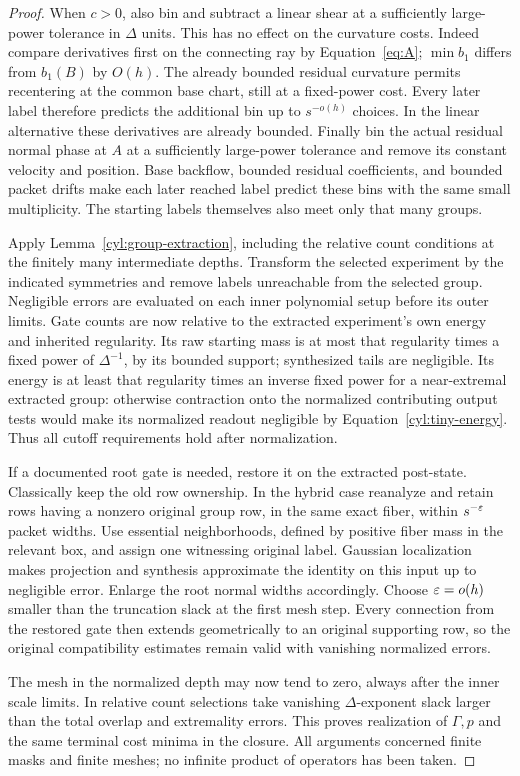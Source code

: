 \begin{proof}
When $c>0$, also bin and subtract a linear shear at a sufficiently
large-power tolerance in $\Delta$ units.  This has no effect on the
curvature costs.  Indeed compare derivatives first on the connecting
ray by Equation~\eqref{eq:A}; $\min b_1$ differs from $b_1(B)$ by
$O(h)$.  The already bounded residual curvature permits recentering
at the common base chart, still at a fixed-power cost.  Every later
label therefore predicts the additional bin up to $s^{-o(h)}$ choices.
In the linear alternative these derivatives are already bounded.
Finally bin the actual residual normal phase at $A$ at a sufficiently
large-power tolerance and remove its constant velocity and position.
Base backflow, bounded residual coefficients, and bounded packet drifts
make each later reached label predict these bins with the same small
multiplicity.  The starting labels themselves also meet only that many
groups.

Apply Lemma~\ref{cyl:group-extraction}, including the relative count
conditions at the finitely many intermediate depths.  Transform the
selected experiment by the indicated symmetries and remove labels
unreachable from the selected group.  Negligible errors are evaluated
on each inner polynomial setup before its outer limits.  Gate counts
are now relative to the extracted experiment's own energy and inherited
regularity.  Its raw starting mass is at most that regularity times a
fixed power of $\Delta^{-1}$, by its bounded support; synthesized tails
are negligible.  Its energy is at least that regularity times an inverse
fixed power for a near-extremal extracted group: otherwise contraction
onto the normalized contributing output tests would make its normalized
readout negligible by Equation~\eqref{cyl:tiny-energy}.  Thus all cutoff
requirements hold after normalization.

If a documented root gate is needed, restore it on the extracted
post-state.  Classically keep the old row ownership.  In the hybrid case
reanalyze and retain rows having a nonzero original group row, in the
same exact fiber, within $s^{-\varepsilon}$ packet widths.  Use essential
neighborhoods, defined by positive fiber mass in the relevant box, and
assign one witnessing original label.  Gaussian localization makes
projection and synthesis approximate the identity on this input up to
negligible error.  Enlarge the root normal widths accordingly.  Choose
$\varepsilon=o(h)$ smaller than the truncation slack at the first mesh step.
Every connection from the restored gate then extends geometrically to
an original supporting row, so the original compatibility estimates
remain valid with vanishing normalized errors.

The mesh in the normalized depth may now tend to zero, always after
the inner scale limits.  In relative count selections take vanishing
$\Delta$-exponent slack larger than the total overlap and extremality
errors.  This proves realization of $\Gamma,p$ and the same terminal
cost minima in the closure.  All arguments concerned finite masks and
finite meshes; no infinite product of operators has been taken.
\end{proof}

